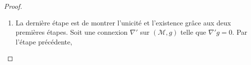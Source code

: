 \documentclass[a4paper,11pt]{report}
\theoremstyle{definition}
\theoremstyle{plain}
\theoremstyle{definition}
\theoremstyle{remark}
\newcommand{\M}{\mathscr{M}}
\newcommand{\p}{\partial}
\newcommand{\chris}[3]{\begin{Bmatrix}#1\\#2#3\end{Bmatrix}}
\begin{document}
\begin{proof}
\begin{enumerate}[label = \textit{\roman*)}]
\begin{align}
                                 &= T^\kappa_{~\lambda\mu}g_{\kappa\mu}+T^\kappa_{~\lambda\nu}g_{\nu\kappa}-2\Gamma^\kappa_{~(\mu\nu)}g_{\lambda\kappa} + \left( -\p_\lambda g_{\mu\nu}+\p_\mu g_{\lambda\nu} + \p_\nu g_{\lambda\mu}\right)
                            \end{align}
                            Multiplions de chaque coté par $g^{\sigma\lambda}$ et notons que
                            \begin{equation} g^{\sigma\lambda}\Gamma^\kappa_{~(\mu\nu)}g_{\lambda\kappa} = \delta^\sigma_\kappa
                            \end{equation}
                            Ce qui permet d'obtenir l'expression suivante pour $\Gamma^\kappa_{~(\mu\nu)}$:
                            \begin{align}
                                \Gamma^\kappa_{~(\mu\nu)} &= \frac{1}{2}g^{\sigma\lambda}\left( -\p_\lambda g_{\mu\nu}+\p_\mu g_{\lambda\nu} + \p_\nu g_{\lambda\mu}\right)+\frac{1}{2}T^\kappa_{~\lambda\mu}g^{\sigma\lambda}g_{\kappa\mu}+\frac{1}{2}T^\kappa_{~\lambda\nu}g^{\sigma\lambda}g_{\nu\kappa}\\
                                &= \chris{\kappa}{\mu}{\nu}+\frac{1}{2}\left( T\indices{_\nu^\kappa_\mu}+T\indices{_\mu^\kappa_\nu} \right)\\
                                &= \chris{\kappa}{\mu}{\nu} + T\indices{_{(\nu}^\kappa_{\mu)}}
                            \end{align}
                            Enfin,
                            \begin{align}
                                 \Gamma^\sigma_{~\mu\nu} &=  \Gamma^\sigma_{~(\mu\nu)}+ \Gamma^\sigma_{~[\mu\nu]}\\
                                 &= \chris{\sigma}{\mu}{\nu} + T\indices{_{(\nu}^\sigma_{\mu)}} + \frac{1}{2}T^\sigma_{~\mu\nu}\\
                                 &=  \chris{\sigma}{\mu}{\nu}+\underbrace{\frac{1}{2}\left( T\indices{_\nu^\kappa_\mu}+T\indices{_\mu^\kappa_\nu} +T^\sigma_{\mu_\nu}\right)}_{K\indices{_\mu^\sigma_\nu}}
                            \end{align}
                        \item La dernière étape est de montrer l'unicité et l'existence grâce aux deux premières étapes. Soit une connexion $\nabla'$ sur $(\M,g)$ telle que $\nabla'g = 0$. Par l'étape précédente,
                        \begin{equation}

\end{equation}
\end{enumerate}
\end{proof}
\end{document}
